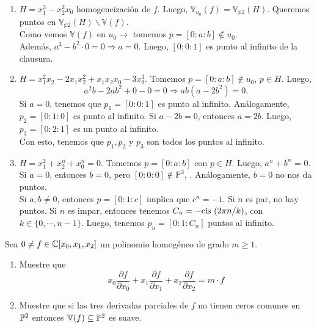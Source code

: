 \begin{sol}
	\begin{enumerate}
		\item  $H = x_1^3 - x_2^2 x_0$ homogeneización de $f$. Luego, $\mathbb{V}_{u_0} (f) = \mathbb{V}_{\mathbb{p}2} (H)$. Queremos puntos en  $\mathbb{V}_{\mathbb{p}2} (H) \backslash \mathbb{V} (f)$. \\
		      Como vemos $\mathbb{V} (f)$ en $u_0 \rightarrow$ tomemos $p = [0:a:b] \not\in u_0$.  \\
		      Además, $a^3 - b^2 \cdot 0 = 0 \Rightarrow a = 0$. Luego, $[0:0:1]$ es punto al infinito de la clausura.

		\item $H = x_1^2 x_2 - 2 x_1 x_2^2 + x_1x_2x_0 - 3x_0^3$. Tomemos $p = [0: a: b] \not\in u_0$, $p \in H$. Luego,
		      \[a^2b - 2ab^2 +0 - 0 = 0 \Rightarrow ab(a - 2b^2) = 0.\]
		      Si $a = 0$, tenemos que $p_1 = [0:0:1]$ es punto al infinito. Análogamente, $p_2 = [0:1:0]$ es punto al infinito. Si $a - 2b = 0$, entonces $a = 2b$. Luego, $p_3 = [0:2:1]$ es un punto al infinito. \\
		      Con esto, tenemos que $p_1, p_2$ y $p_3$ son todos los puntos al infinito. \\
		\item  $H = x_1^2 + x_2^n + x_0^n = 0$. Tomemos $p = [0:a:b]$ con $p \in H$. Luego, $a^n + b^n$ = 0. Si $a = 0$, entonces $b = 0$, pero $[0:0:0] \notin \mathbb{P}^3$, \nope. Análogamente, $b = 0$ no nos da puntos. \\
		      Si $a, b \not= 0$, entonces $p = [0:1:c]$ implica que $c^n = -1$. Si $n$ es par, no hay puntos. Si $n$ es impar, entonces tenemos $C_n = -\text{cis }(2\pi n/k)$, con $k \in \{0, \cdots, n-1\}$. Luego, tenemos $p_n = [0:1:C_n]$ puntos al infinito.
	\end{enumerate}
\end{sol}

\begin{prob}[3 pts. c/u]
	Sea $0\neq f\in\mathbb{C}[x_0,x_1,x_2]$ un polinomio homogéneo de grado $m\geq1$.
	\begin{enumerate}
		\item Muestre que
		      \[x_0\frac{\partial f}{\partial x_0}+x_1\frac{\partial f}{\partial x_1}+x_2\frac{\partial f}{\partial x_2}=m\cdot f\]
		\item Muestre que si las tres derivadas parciales de $f$ no tienen ceros comunes en $\mathbb{P}^2$ entonces $\mathbb{V}(f)\subseteq\mathbb{P}^2$ es suave.
	\end{enumerate}
\end{prob}

